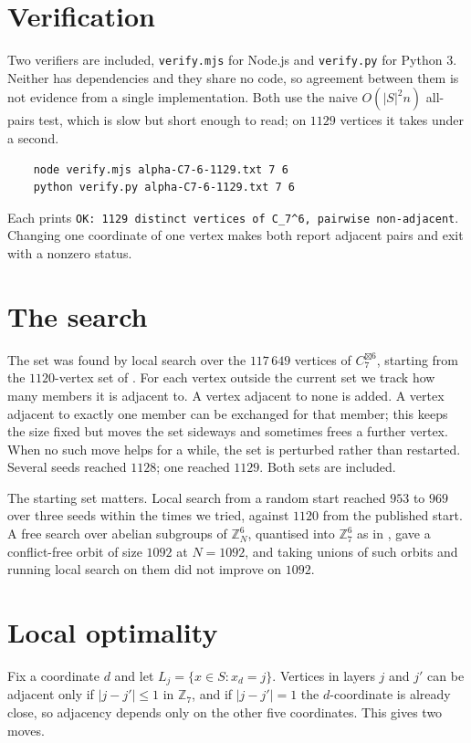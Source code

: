 \documentclass[11pt,a4paper]{article}
\newcommand{\bt}{\boxtimes}
\begin{document}
\section{Verification}

Two verifiers are included, \texttt{verify.mjs} for Node.js and \texttt{verify.py} for
Python 3. Neither has dependencies and they share no code, so agreement between them is not
evidence from a single implementation. Both use the naive $O(|S|^2 n)$ all-pairs test, which
is slow but short enough to read; on $1129$ vertices it takes under a second.
\begin{verbatim}
    node verify.mjs alpha-C7-6-1129.txt 7 6
    python verify.py alpha-C7-6-1129.txt 7 6
\end{verbatim}
Each prints \texttt{OK: 1129 distinct vertices of C\_7\^{}6, pairwise non-adjacent}. Changing
one coordinate of one vertex makes both report adjacent pairs and exit with a nonzero status.

\section{The search}

The set was found by local search over the $117\,649$ vertices of $C_7^{\bt 6}$, starting from
the $1120$-vertex set of \cite{Itty}. For each vertex outside the current set we track how
many members it is adjacent to. A vertex adjacent to none is added. A vertex adjacent to
exactly one member can be exchanged for that member; this keeps the size fixed but moves the
set sideways and sometimes frees a further vertex. When no such move helps for a while, the
set is perturbed rather than restarted. Several seeds reached $1128$; one reached $1129$. Both
sets are included.

The starting set matters. Local search from a random start reached $953$ to $969$ over three
seeds within the times we tried, against $1120$ from the published start. A free search over abelian subgroups of $\mathbb{Z}_N^6$, quantised into
$\mathbb{Z}_7^6$ as in \cite{PS}, gave a conflict-free orbit of size $1092$ at $N = 1092$, and
taking unions of such orbits and running local search on them did not improve on $1092$.

\section{Local optimality}

Fix a coordinate $d$ and let $L_j = \{x \in S : x_d = j\}$. Vertices in layers $j$ and $j'$
can be adjacent only if $|j - j'| \le 1$ in $\mathbb{Z}_7$, and if $|j-j'| = 1$ the
$d$-coordinate is already close, so adjacency depends only on the other five coordinates.
This gives two moves.
\end{document}
